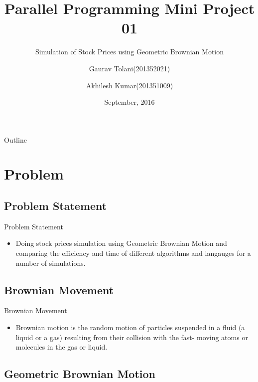 \documentclass{beamer}
\title{Parallel Programming Mini Project 01}
\subtitle{Simulation of Stock Prices using Geometric Brownian Motion}
\author{Gaurav Tolani(201352021)\inst{} \and Akhilesh Kumar(201351009)}
\institute[IIITV] %
{
  \inst{}%
  Indian Institute of Information Technology, Vadodara\\
  
  }
\date{September, 2016}
\begin{document}
\begin{frame}
  \titlepage
\end{frame}

\begin{frame}{Outline}
  \tableofcontents
\end{frame}

\section{Problem}

\subsection{Problem Statement}

\begin{frame}{Problem Statement}
  \begin{itemize}
  \item {
    Doing stock prices simulation using Geometric Brownian Motion and comparing the efficiency and time of different algorithms and langauges for a number of simulations.
  }
  \end{itemize}
\end{frame}

\subsection{Brownian Movement}

\begin{frame}{Brownian Movement}
  \begin{itemize}
  \item {
    Brownian motion is the random motion of particles suspended in a
fluid (a liquid or a gas) resulting from their collision with the fast-
moving atoms or molecules in the gas or liquid.
  }
  
  \end{itemize}
\end{frame}

\subsection{Geometric Brownian Motion}
\end{document}
